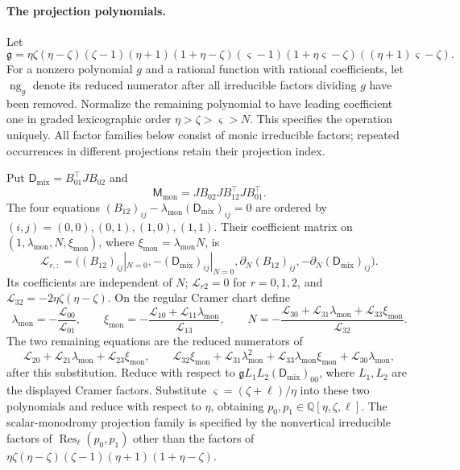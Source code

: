 \documentclass[11pt,a4paper]{article}
\numberwithin{equation}{section}
\theoremstyle{plain}
\theoremstyle{definition}
\theoremstyle{remark}
\begin{document}
\paragraph{The projection polynomials.}
Let
\[
 \mathfrak g=\eta\zeta(\eta-\zeta)(\zeta-1)(\eta+1)
 (1+\eta-\zeta)(\varsigma-1)
 (1+\eta\varsigma-\zeta)((\eta+1)\varsigma-\zeta).
\]
For a nonzero polynomial $g$ and a rational function with rational coefficients, let
$\operatorname{ng}_{g}$ denote its reduced numerator after all
irreducible factors dividing $g$ have been removed. Normalize the
remaining polynomial to have leading coefficient one in graded lexicographic
order $\eta>\zeta>\varsigma>N$. This specifies the operation uniquely.
All factor families below consist of monic irreducible factors; repeated
occurrences in different projections retain their projection index.

Put $\mathsf D_{\mathrm{mix}}=B_{01}^{\top}JB_{02}$ and
\[
 \mathsf M_{\mathrm{mon}}=JB_{02}JB_{12}^{\top}JB_{01}^{\top}.
\]
The four equations $(B_{12})_{ij}-\lambda_{\mathrm{mon}} (\mathsf D_{\mathrm{mix}})_{ij}=0$ are ordered by
$(i,j)=(0,0),(0,1),(1,0),(1,1)$. Their coefficient matrix on
$(1,\lambda_{\mathrm{mon}},N,\xi_{\mathrm{mon}})$, where $\xi_{\mathrm{mon}}=\lambda_{\mathrm{mon}} N$, is
\[
 \mathscr L_{r,:}
 =\bigl((B_{12})_{ij}|_{N=0},-(\mathsf D_{\mathrm{mix}})_{ij}|_{N=0},
             \partial_N(B_{12})_{ij},-\partial_N(\mathsf D_{\mathrm{mix}})_{ij}\bigr).
\]
Its coefficients are independent of $N$;
$\mathscr L_{r2}=0$ for $r=0,1,2$, and
$\mathscr L_{32}=-2\eta\zeta(\eta-\zeta)$.
On the regular Cramer chart define
\[
 \lambda_{\mathrm{mon}}=-\frac{\mathscr L_{00}}{\mathscr L_{01}},\qquad
 \xi_{\mathrm{mon}}=-\frac{\mathscr L_{10}+\mathscr L_{11}\lambda_{\mathrm{mon}}}
                 {\mathscr L_{13}},\qquad
 N=-\frac{\mathscr L_{30}+\mathscr L_{31}\lambda_{\mathrm{mon}}+
                         \mathscr L_{33}\xi_{\mathrm{mon}}}{\mathscr L_{32}}.
\]
The two remaining equations are the reduced numerators of
\[
 \mathscr L_{20}+\mathscr L_{21}\lambda_{\mathrm{mon}}+\mathscr L_{23}\xi_{\mathrm{mon}},
 \qquad
 \mathscr L_{32}\xi_{\mathrm{mon}}+\mathscr L_{31}\lambda_{\mathrm{mon}}^2+
               \mathscr L_{33}\lambda_{\mathrm{mon}}\xi_{\mathrm{mon}}+\mathscr L_{30}\lambda_{\mathrm{mon}},
\]
after this substitution. Reduce with respect to
$\mathfrak gL_1L_2(\mathsf D_{\mathrm{mix}})_{00}$, where $L_1,L_2$ are the displayed
Cramer factors. Substitute
$\varsigma=(\zeta+\ell)/\eta$ into these two polynomials and reduce
with respect to $\eta$, obtaining $p_0,p_1\in
\mathbb Q[\eta,\zeta,\ell]$. The scalar-monodromy projection family is
specified by the nonvertical irreducible factors of
$\operatorname{Res}_{\ell}(p_0,p_1)$ other than the factors of
$\eta\zeta(\eta-\zeta)(\zeta-1)(\eta+1)(1+\eta-\zeta)$.
\end{document}

